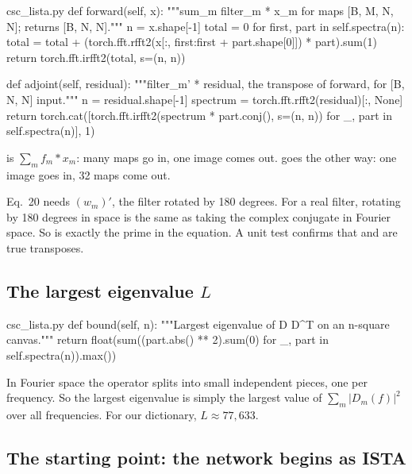 \begin{code*}{csc_lista.py}
    def forward(self, x):
        """sum_m filter_m * x_m for maps [B, M, N, N]; returns [B, N, N]."""
        n = x.shape[-1]
        total = 0
        for first, part in self.spectra(n):
            total = total + (torch.fft.rfft2(x[:, first:first + part.shape[0]]) * part).sum(1)
        return torch.fft.irfft2(total, s=(n, n))

    def adjoint(self, residual):
        """filter_m' * residual, the transpose of forward, for [B, N, N] input."""
        n = residual.shape[-1]
        spectrum = torch.fft.rfft2(residual)[:, None]
        return torch.cat([torch.fft.irfft2(spectrum * part.conj(), s=(n, n))
                          for _, part in self.spectra(n)], 1)
\end{code*}

 is $\sum_m f_m*x_m$: many maps go in, one image comes out.  goes the
other way: one image goes in, 32 maps come out.

\begin{keyidea}
Eq.~20 needs $(w_m)'$, the filter rotated by 180 degrees. For a real filter, rotating by 180 degrees in
space is the same as taking the complex conjugate in Fourier space. So  is exactly the prime in
the equation. A unit test confirms that  and  are true transposes.
\end{keyidea}

\subsection*{The largest eigenvalue $L$}

\begin{code*}{csc_lista.py}
    def bound(self, n):
        """Largest eigenvalue of D D^T on an n-square canvas."""
        return float(sum((part.abs() ** 2).sum(0) for _, part in self.spectra(n)).max())
\end{code*}

In Fourier space the operator splits into small independent pieces, one per frequency. So the
largest eigenvalue is simply the largest value of $\sum_m|D_m(f)|^2$ over all frequencies. For our
dictionary, $L\approx77{,}633$.

\subsection*{The starting point: the network begins as ISTA}

